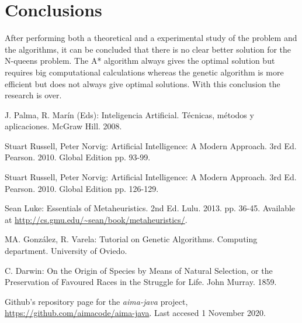 \documentclass[]{llncs}
\begin{document}
\section{Conclusions}\label{conclusions}
After performing both a theoretical and a experimental study of the problem and the algorithms, it can be concluded that there is no clear better solution for the N-queens problem. The A* algorithm always gives the optimal solution but requires big computational calculations whereas the genetic algorithm is more efficient but does not always give optimal solutions. With this conclusion the research is over.
\begin{thebibliography}{8}
J. Palma, R. Marín (Eds): Inteligencia Artificial. Técnicas, métodos y aplicaciones. McGraw Hill. 2008.

Stuart Russell, Peter Norvig: Artificial Intelligence: A Modern Approach. 3rd Ed. Pearson. 2010. Global Edition pp. 93-99.

Stuart Russell, Peter Norvig: Artificial Intelligence: A Modern Approach. 3rd Ed. Pearson. 2010. Global Edition pp. 126-129.

Sean Luke: Essentials of Metaheuristics. 2nd Ed. Lulu. 2013. pp. 36-45. Available at \url{http://cs.gmu.edu/~sean/book/metaheuristics/}.

MA. González, R. Varela: Tutorial on Genetic Algorithms. Computing department. University of Oviedo.

C. Darwin: On the Origin of Species by Means of Natural Selection, or the Preservation of Favoured Races in the Struggle for Life. John Murray. 1859.
 
Github's repository page for the \textit{aima-java} project, \url{https://github.com/aimacode/aima-java}. Last accesed 1 November 2020.
\end{thebibliography}
\end{document}

